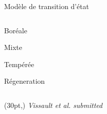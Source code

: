 \documentclass[11pt, compress, aspectratio=1610]{beamer}
\newcommand\smallcitation[1]{%
\begin{textblock*}{\textwidth}(30pt,\textheight)
	\raggedleft \footnotesize\textit{#1}
\end{textblock*}}
\providecommand{\tightlist}{%
  \setlength{\itemsep}{0pt}\setlength{\parskip}{0pt}}
\newcommand{\begincols}{\begin{columns}}
\newcommand{\stopcols}{\end{columns}}
\begin{document}
\begin{frame}{Modèle de transition d’état}
\protect\hypertarget{moduxe8le-de-transition-duxe9tat}{}

\begincols
{}
  
\hfill{}
\vspace{-5mm}

\begin{description}
\tightlist
\item[B]
Boréale
\item[M]
Mixte
\item[T]
Tempérée
\item[R]
Régeneration
\end{description}

\stopcols

\smallcitation{Vissault et al. submitted}

\end{frame}
\end{document}
